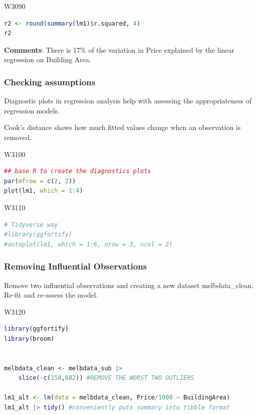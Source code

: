 
\begin{ocg}{}{W309}{0}
\begin{lstlisting}[language = R]
r2 <- round(summary(lm1)$r.squared, 4)
r2
\end{lstlisting}
\end{ocg}

\textbf{Comments}: There is 17\% of the variation in Price explained by the linear regression on Building Area.

\subsubsection{Checking assumptions}

\indent

Diagnostic plots in regression analysis help with assessing the appropriateness of regression models.

Cook’s distance shows how much fitted values change when an observation is removed.


\begin{ocg}{}{W310}{0}
\begin{lstlisting}[language = R]
## base R to create the diagnostics plots 
par(mfrow = c(2, 2))
plot(lm1, which = 1:4)
\end{lstlisting}
\end{ocg}


\begin{ocg}{}{W311}{0}
\begin{lstlisting}[language = R]
# Tidyverse way
#library(ggfortify)
#autoplot(lm1, which = 1:6, nrow = 3, ncol = 2)
\end{lstlisting}
\end{ocg}

\subsubsection{Removing Influential Observations}

\indent 

Remove two influential observations and creating a new dataset melbdata\_clean. Re-fit and re-assess the model.


\begin{ocg}{}{W312}{0}
\begin{lstlisting}[language = R]
library(ggfortify)
library(broom)


melbdata_clean <- melbdata_sub |> 
    slice(-c(158,682)) #REMOVE THE WORST TWO OUTLIERS

lm1_alt <- lm(data = melbdata_clean, Price/1000 ~ BuildingArea)
lm1_alt |> tidy() #conveniently puts summary into tibble format
\end{lstlisting}
\end{ocg}

